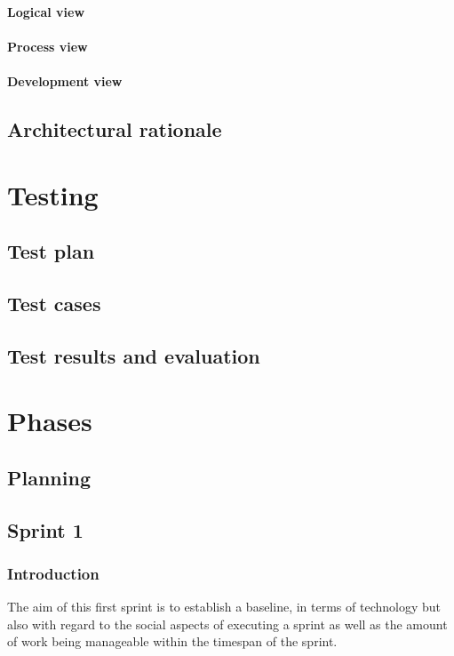 \documentclass[11pt]{book}
\begin{document}
\subsubsection{Logical view}

\subsubsection{Process view}

\subsubsection{Development view}

\section{Architectural rationale}

\chapter{Testing}

\section{Test plan}

\section{Test cases}

\section{Test results and evaluation}

\chapter{Phases}
\section{Planning}

\section{Sprint 1}
\subsection{Introduction}
The aim of this first sprint is to establish a baseline, in terms of technology but also with regard to the social aspects of executing a sprint as well as the amount of work being manageable within the timespan of the sprint.
\end{document}
